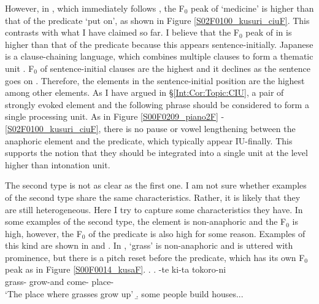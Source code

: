 However, in \Last[b], which immediately follows \Last[a],
the F$_{0}$ peak of  `medicine' is higher than that of the predicate  `put on',
as shown in Figure \ref{S02F0100_kusuri_ciuF}.
This contrasts with what I have claimed so far.
I believe that the F$_{0}$ peak of  in \Last[b] is higher than that of the predicate because this appears sentence-initially.
Japanese is a clause-chaining language,
which combines multiple clauses to form a thematic unit \cite{longacre85,martin92,givon01}.
F$_{0}$ of sentence-initial clauses are the highest and it declines as the sentence goes on \cite{koisoishimoto12,ishimotokoiso12,ishimotokoiso13}.
Therefore,
the elements in the sentence-initial position are the highest among other elements.
As I have argued in \S \ref{Int:Cor:Topic:CIU},
a pair of strongly evoked element and the following phrase should be considered to form a single processing unit.
As in Figure \ref{S00F0209_piano2F} - \ref{S02F0100_kusuri_ciuF},
there is no pause or vowel lengthening between the anaphoric element and the predicate,
which typically appear IU-finally.
This supports the notion that they should be integrated into a single unit at the level higher than intonation unit.


The second type is not as clear as the first one.
I am not sure whether examples of the second type share the same characteristics.
Rather, it is likely that they are still heterogeneous.
Here I try to capture some characteristics they have.
In some examples of the second type,
the element is non-anaphoric and the F$_{0}$ is high,
however, the F$_{0}$ of the predicate is also high for some reason.
Examples of this kind are shown in \Next and \NNext.
In \Next,  `grass' is non-anaphoric and is uttered with prominence,
but there is a pitch reset before the predicate, which has its own F$_{0}$ peak as in Figure \ref{S00F0014_kusaF}.
%
\ex.\label{S00F0014_kusa}
 \ag.  \tp{\dvline} -te ki-ta \tp{\dvline} tokoro-ni \tp{\dvline} \\
 		grass- {} grow-and come- {} place- {} \\
		`The place where grasses grow up'
 \b. some people build houses...

